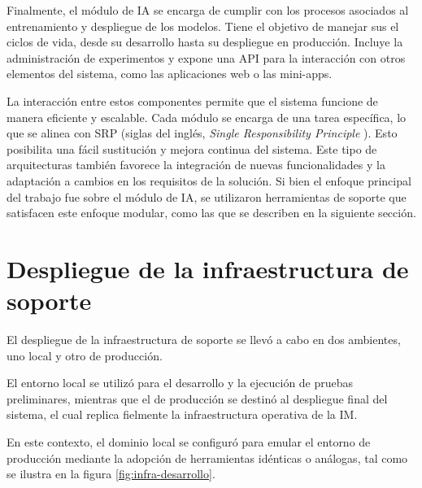 Finalmente, el módulo de IA se encarga de cumplir con los procesos asociados al entrenamiento y despliegue de los modelos. Tiene el objetivo de manejar sus el ciclos de vida, desde su desarrollo hasta su despliegue en producción. Incluye la administración de experimentos y expone una API para la interacción con otros elementos del sistema, como las aplicaciones web o las mini-apps.


La interacción entre estos componentes permite que el sistema funcione de manera eficiente y escalable. Cada módulo se encarga de una tarea específica, lo que se alinea con SRP (siglas del inglés, \textit{Single Responsibility Principle} \citep{soni_software_2024}). Esto posibilita una fácil sustitución y mejora continua del sistema. Este tipo de arquitecturas también favorece la integración de nuevas funcionalidades y la adaptación a cambios en los requisitos de la solución. Si bien el enfoque principal del trabajo fue sobre el módulo de IA, se utilizaron herramientas de soporte que satisfacen este enfoque modular, como las que se describen en la siguiente sección.


\section{Despliegue de la infraestructura de soporte}
\label{sec:despliegue_infraestructura}

El despliegue de la infraestructura de soporte se llevó a cabo en dos ambientes, uno local y otro de producción.

El entorno local se utilizó para el desarrollo y la ejecución de pruebas preliminares, mientras que el de producción se destinó al despliegue final del sistema, el cual replica fielmente la infraestructura operativa de la IM.

En este contexto, el dominio local se configuró para emular el entorno de producción mediante la adopción de herramientas idénticas o análogas, tal como se ilustra en la figura \ref{fig:infra-desarrollo}.

